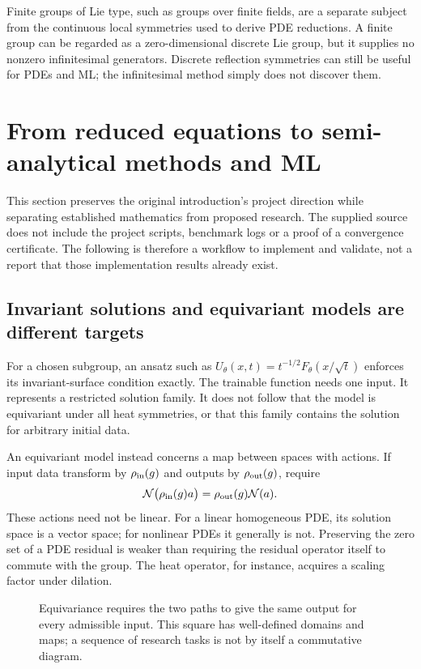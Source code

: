 \documentclass[11pt,a4paper]{article}
\numberwithin{equation}{section}
\theoremstyle{definition}
\theoremstyle{plain}
\theoremstyle{remark}
\begin{document}
Finite groups of Lie type, such as groups over finite fields, are a separate subject from the continuous local symmetries used to derive PDE reductions. A finite group can be regarded as a zero-dimensional discrete Lie group, but it supplies no nonzero infinitesimal generators. Discrete reflection symmetries can still be useful for PDEs and ML; the infinitesimal method simply does not discover them.

\section{From reduced equations to semi-analytical methods and ML}\label{sec:ml}
This section preserves the original introduction's project direction while separating established mathematics from proposed research. The supplied source does not include the project scripts, benchmark logs or a proof of a convergence certificate. The following is therefore a workflow to implement and validate, not a report that those implementation results already exist.

\subsection{Invariant solutions and equivariant models are different targets}
For a chosen subgroup, an ansatz such as $U_\theta(x,t)=t^{-1/2}F_\theta(x/\sqrt t)$ enforces its invariant-surface condition exactly. The trainable function needs one input. It represents a restricted solution family. It does not follow that the model is equivariant under all heat symmetries, or that this family contains the solution for arbitrary initial data.

An equivariant model instead concerns a map between spaces with actions. If input data transform by $\rho_{\rm in}(g)$ and outputs by $\rho_{\rm out}(g)$, require
\[
\mathcal N\bigl(\rho_{\rm in}(g)a\bigr)
=\rho_{\rm out}(g)\mathcal N(a).
\]
These actions need not be linear. For a linear homogeneous PDE, its solution space is a vector space; for nonlinear PDEs it generally is not. Preserving the zero set of a PDE residual is weaker than requiring the residual operator itself to commute with the group. The heat operator, for instance, acquires a scaling factor under dilation.

\begin{figure}[htbp]\centering
{}
\caption{Equivariance requires the two paths to give the same output for every admissible input. This square has well-defined domains and maps; a sequence of research tasks is not by itself a commutative diagram.}
\end{figure}
\end{document}
